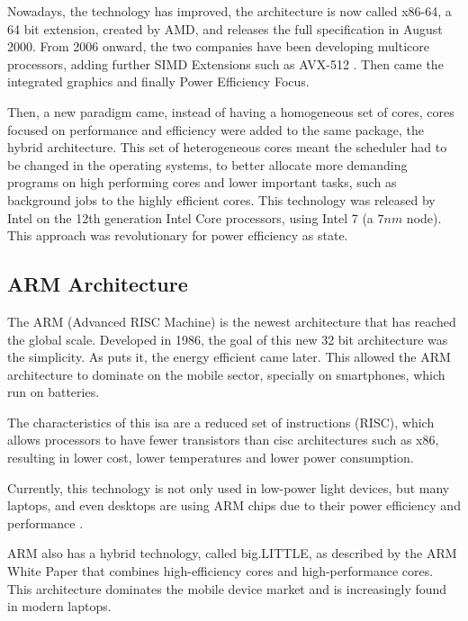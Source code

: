 Nowadays, the technology has improved, the architecture is now called x86-64, a 64 bit extension, created by AMD, and releases the full specification in August 2000. From 2006 onward, the two companies have been developing multicore processors, adding further \gls{SIMD} Extensions such as AVX-512 \cite{intel-avx512}. Then came the integrated graphics and finally Power Efficiency Focus. 

Then, a new paradigm came, instead of having a homogeneous set of cores, cores focused on performance and efficiency were added to the same package, the hybrid architecture. This set of heterogeneous cores meant the scheduler had to be changed in the operating systems, to better allocate more demanding programs on high performing cores and lower important tasks, such as background jobs to the highly efficient cores. This technology was released by Intel on the 12th generation Intel Core processors, using Intel 7 (a $7 nm$ node). This approach was revolutionary for power efficiency as \textcite{big-little} state.


\subsection{\gls{ARM} Architecture}
The \gls{ARM} (Advanced RISC Machine) is the newest architecture that has reached the global scale. Developed in 1986, the goal of this new 32 bit architecture was the simplicity. As \textcite{arm:story} puts it, the energy efficient came later. This allowed the \gls{ARM} architecture to dominate on the mobile sector, specially on smartphones, which run on batteries.

The characteristics of this \gls{isa} are a reduced set of instructions (\gls{RISC}), which  allows processors to have fewer transistors than \gls{cisc} architectures such as x86, resulting in lower cost, lower temperatures and lower power consumption.

Currently, this technology is not only used in low-power light devices, but many laptops, and even desktops are using \gls{ARM} chips due to their power efficiency and performance \cite{arm:optimization-big.LITTLE}.

\gls{ARM} also has a hybrid technology, called big.LITTLE, as described by the \cite{arm:biglittle2013}{ \gls{ARM} White Paper} that combines high-efficiency cores and high-performance cores. This architecture dominates the mobile device market and is increasingly found in modern laptops. 




